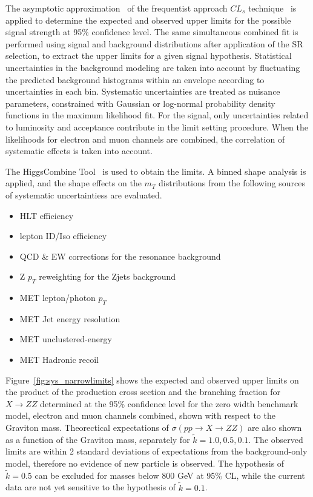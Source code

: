 \vspace{0.3cm}
The asymptotic approximation~\cite{sys_cls0} of the frequentist approach $CL_s$ technique~\cite{sys_cls1,sys_cls2,sys_cls3} is applied to determine the expected and observed upper limits for the possible signal strength at 95\% confidence level. The same simultaneous combined fit is performed using signal and background distributions after application of the SR selection, to extract the upper limits for a given signal hypothesis. Statistical uncertainties in the background modeling are taken into account by fluctuating the predicted background histograms within an envelope according to uncertainties in each bin. Systematic uncertainties are treated as nuisance parameters, constrained with Gaussian or log-normal probability density functions in the maximum likelihood fit. For the signal, only uncertainties related to luminosity and acceptance contribute in the limit setting procedure. When the likelihoods for electron and muon channels are combined, the correlation of systematic effects is taken into account. 

\vspace{0.3cm}
The HiggsCombine Tool~\cite{sys_higgscombinetool} is used to obtain the limits. A binned shape analysis is applied, and the shape effects on the $m_T$ distributions from the following sources of systematic uncertaintiess are evaluated.
\begin{itemize}
\item HLT efficiency
\item lepton ID/Iso efficiency
\item QCD \& EW corrections for the resonance background
\item Z $p_T$ reweighting for the Zjets background
\item MET lepton/photon $p_T$
\item MET Jet energy resolution
\item MET unclustered-energy
\item MET Hadronic recoil 
\end{itemize}

\vspace{0.3cm}
Figure~\ref{fig:sys_narrowlimits} shows the expected and observed upper limits on the product of the production cross section and the branching fraction for $X\rightarrow ZZ$ determined at the 95\% confidence level for the zero width benchmark model, electron and muon channels combined, shown with respect to the Graviton mass. Theorectical expectations of $\sigma(pp\rightarrow X\rightarrow ZZ)$ are also shown as a function of the Graviton mass, separately for $\tilde{k}=1.0,0.5,0.1$. The observed limits are within 2 standard deviations of expectations from the background-only model, therefore no evidence of new particle is observed. The hypothesis of $\tilde{k}=0.5$ can be excluded for masses below 800 GeV at 95\% CL, while the current data are not yet sensitive to the hypothesis of $\tilde{k}=0.1$. 

